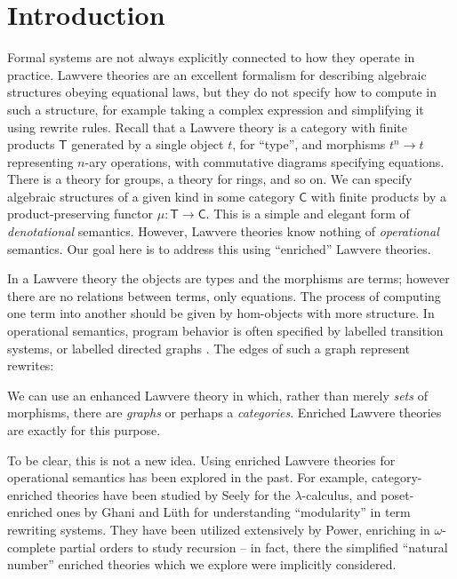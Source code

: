 \documentclass{amsart}
\theoremstyle{definition}
\newcommand{\C}{\mathsf{C}}
\newcommand{\T}{\mathsf{T}}
\newcommand{\maps}{\colon}
\begin{document}
\section{Introduction}

Formal systems are not always explicitly connected to how they operate in practice.   Lawvere theories  \cite{lawvere} are an excellent formalism for describing algebraic structures obeying equational laws, but they do not specify how to compute in such a structure, for example taking a complex expression and simplifying it using rewrite rules.   Recall that a Lawvere theory is a category with finite products $\T$ generated by a single object $t$, for ``type'', and morphisms $t^n \to t$ representing $n$-ary operations, with commutative diagrams specifying equations.   There is a theory for groups, a theory for rings, and so on.   We can specify algebraic structures of a given kind in some category $\C$ with finite products by a product-preserving functor $\mu \maps\T \to \C$.   This is a simple and elegant form of \emph{denotational} semantics.    However, Lawvere theories know nothing of \emph{operational} semantics.  Our goal here is to address this using ``enriched'' Lawvere theories.

In a Lawvere theory the objects are types and the morphisms are terms; however there are no relations between terms, only equations. The process of computing one term into another should be given by hom-objects with more structure.  In operational semantics, program behavior is often specified by labelled transition systems, or labelled directed graphs \cite{sos}.  The edges of such a graph represent rewrites:
\begin{center}\end{center}
We can use an enhanced Lawvere theory in which, rather than merely \emph{sets} of morphisms, there are \emph{graphs} or perhaps a \emph{categories}. Enriched Lawvere theories are exactly for this purpose.

To be clear, this is not a new idea. Using enriched Lawvere theories for operational semantics has been explored in the past. For example, category-enriched theories have been studied by Seely \cite{seely} for the $\lambda$-calculus, and poset-enriched ones by Ghani and L\"uth \cite{ghani} for understanding ``modularity'' in term rewriting systems.  They have been utilized extensively by Power, enriching in $\omega$-complete partial orders to study recursion \cite{compeffects} -- in fact, there the simplified ``natural number'' enriched theories which we explore were implicitly considered.
\end{document}
